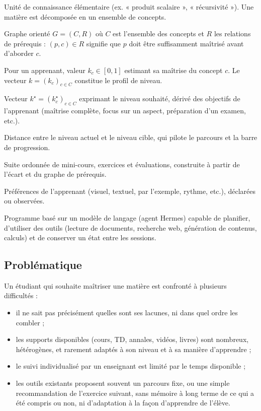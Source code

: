 \documentclass[11pt,a4paper]{article}
\begin{document}
\begin{description}[leftmargin=!,labelwidth=4cm]
  \item[Concept] Unité de connaissance élémentaire (ex. « produit scalaire », « récursivité »). Une matière est décomposée en un ensemble de concepts.
  \item[Graphe de concepts] Graphe orienté $G=(C,R)$ où $C$ est l'ensemble des concepts et $R$ les relations de prérequis : $(p,c)\in R$ signifie que $p$ doit être suffisamment maîtrisé avant d'aborder $c$.
  \item[Niveau de maîtrise] Pour un apprenant, valeur $k_c\in[0,1]$ estimant sa maîtrise du concept $c$. Le vecteur $k=(k_c)_{c\in C}$ constitue le profil de niveau.
  \item[Niveau cible] Vecteur $k^\star=(k^\star_c)_{c\in C}$ exprimant le niveau souhaité, dérivé des objectifs de l'apprenant (maîtrise complète, focus sur un aspect, préparation d'un examen, etc.).
  \item[Écart] Distance entre le niveau actuel et le niveau cible, qui pilote le parcours et la barre de progression.
  \item[Parcours d'apprentissage] Suite ordonnée de mini-cours, exercices et évaluations, construite à partir de l'écart et du graphe de prérequis.
  \item[Profil d'apprentissage] Préférences de l'apprenant (visuel, textuel, par l'exemple, rythme, etc.), déclarées ou observées.
  \item[Agent] Programme basé sur un modèle de langage (agent Hermes) capable de planifier, d'utiliser des outils (lecture de documents, recherche web, génération de contenus, calculs) et de conserver un état entre les sessions.
\end{description}

\subsection{Problématique}

Un étudiant qui souhaite maîtriser une matière est confronté à plusieurs difficultés :
\begin{itemize}[noitemsep]
  \item il ne sait pas précisément quelles sont ses lacunes, ni dans quel ordre les combler ;
  \item les supports disponibles (cours, TD, annales, vidéos, livres) sont nombreux, hétérogènes, et rarement adaptés à son niveau et à sa manière d'apprendre ;
  \item le suivi individualisé par un enseignant est limité par le temps disponible ;
  \item les outils existants proposent souvent un parcours fixe, ou une simple recommandation de l'exercice suivant, sans mémoire à long terme de ce qui a été compris ou non, ni d'adaptation à la façon d'apprendre de l'élève.
\end{itemize}
\end{document}
